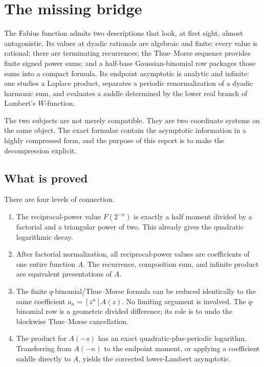 \documentclass[11pt,oneside]{article}
\theoremstyle{definition}
\theoremstyle{remark}
\begin{document}
\section{The missing bridge}
\label{dyadicasym:sec:introduction}

The Fabius function admits two descriptions that look, at first sight, almost antagonistic.
Its values at dyadic rationals are algebraic and finite: every value is rational; there are
terminating recurrences; the Thue--Morse sequence provides finite signed power sums; and a
half-base Gaussian-binomial row packages those sums into a compact formula.  Its endpoint
asymptotic is analytic and infinite: one studies a Laplace product, separates a periodic
renormalization of a dyadic harmonic sum, and evaluates a saddle determined by the lower real
branch of Lambert's $W$-function.

The two subjects are not merely compatible.  They are two coordinate systems on the same
object.  The exact formulae contain the asymptotic information in a highly compressed form,
and the purpose of this report is to make the decompression explicit.

\subsection{What is proved}

There are four levels of connection.

\begin{enumerate}
\item The reciprocal-power value $F(2^{-n})$ is exactly a half moment divided by a factorial
and a triangular power of two.  This already gives the quadratic logarithmic decay.

\item After factorial normalization, all reciprocal-power values are coefficients of one
entire function $A$.  The recurrence, composition sum, and infinite product are equivalent
presentations of $A$.

\item The finite $q$-binomial/Thue--Morse formula can be reduced identically to the same
coefficient $a_n=[z^n]A(z)$.  No limiting argument is involved.  The $q$-binomial row is a
geometric divided difference; its role is to undo the blockwise Thue--Morse cancellation.

\item The product for $A(-s)$ has an exact quadratic-plus-periodic logarithm.  Transferring
from $A(-n)$ to the endpoint moment, or applying a coefficient saddle directly to $A$, yields
the corrected lower-Lambert asymptotic.
\end{enumerate}
\end{document}
